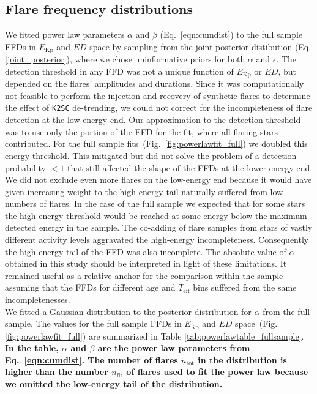 \documentclass{aa}
\begin{document}
\subsection{Flare frequency distributions}
We fitted power law parameters $\alpha$ and $\beta$ (Eq.~\ref{eqn:cumdist}) to the full sample FFDs in $E_\mathrm{Kp}$ and $ED$ space by sampling from the joint posterior distibution (Eq. \ref{joint_posterior}), where we chose uninformative priors for both $\alpha$ and $\epsilon$. 
The detection threshold in any FFD was not a unique function of $E_\mathrm{Kp}$ or $ED$, but depended on the flares' amplitudes and durations. Since it was computationally not feasible to perform the injection and recovery of synthetic flares to determine the effect of \texttt{K2SC} de-trending, we could not correct for the incompleteness of flare detection at the low energy end. Our approximation to the detection threshold was to use only the portion of the FFD for the fit, where all flaring stars contributed. For the full sample fits~(Fig.~\ref{fig:powerlawfit_full}) we doubled this energy threshold. This mitigated but did not solve the problem of a detection probability $<1$ that still affected the shape of the FFDs at the lower energy end. We did not exclude even more flares on the low-energy end because it would have given increasing weight to the high-energy tail naturally suffered from low numbers of flares. In the case of the full sample we expected that for some stars the high-energy threshold would be reached at some energy below the maximum detected energy in the sample. The co-adding of flare samples from stars of vastly different activity levels aggravated the high-energy incompleteness. Consequently the high-energy tail of the FFD was also incomplete. 
The absolute value of $\alpha$ obtained in this study should be interpreted in light of these limitations. It remained useful as a relative anchor for the comparison within the sample assuming that the FFDs for different age and $T_\mathrm{eff}$ bins suffered from the same incompletenesses.
\\
We fitted a Gaussian distribution to the posterior distribution for $\alpha$ from the full sample. The values for the full sample FFDs in $E_\mathrm{Kp}$ and $ED$ space~(Fig. \ref{fig:powerlawfit_full}) are summarized in Table \ref{tab:powerlawtable_fullsample}. \textbf{In the table, $\alpha$ and $\beta$ are the power law parameters from Eq.~\ref{eqn:cumdist}. The number of flares $n_\mathrm{tot}$ in the distribution is higher than the number $n_\mathrm{fit}$ of flares used to fit the power law because we omitted the low-energy tail of the distribution.}
\end{document}
